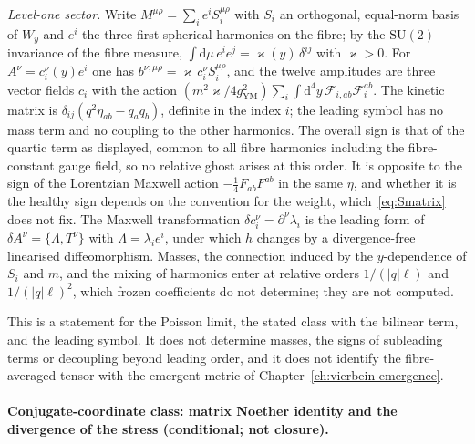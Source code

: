 \emph{Level-one sector.} Write \(M^{\mu\rho}=\sum_ie^iS_i^{\mu\rho}\) with \(S_i\) an orthogonal, equal-norm basis of \(W_y\) and \(e^i\) the three first spherical harmonics on the fibre; by the \(\mathrm{SU}(2)\) invariance of the fibre measure, \(\int\mathrm d\mu\,e^ie^j=\varkappa(y)\,\delta^{ij}\) with \(\varkappa>0\). For \(A^\nu=c^\nu_i(y)e^i\) one has \(b^{\nu;\mu\rho}=\varkappa\,c^\nu_iS_i^{\mu\rho}\), and the twelve amplitudes are three vector fields \(c_i\) with the action \((m^2\varkappa/4g_{\mathrm{YM}}^2)\sum_i\int\mathrm d^4y\,\mathcal F_{i,ab}\mathcal F_i^{ab}\). The kinetic matrix is \(\delta_{ij}(q^2\eta_{ab}-q_aq_b)\), definite in the index \(i\); the leading symbol has no mass term and no coupling to the other harmonics. The overall sign is that of the quartic term as displayed, common to all fibre harmonics including the fibre-constant gauge field, so no relative ghost arises at this order. It is opposite to the sign of the Lorentzian Maxwell action \(-\tfrac14F_{ab}F^{ab}\) in the same \(\eta\), and whether it is the healthy sign depends on the convention for the weight, which~\eqref{eq:Smatrix} does not fix. The Maxwell transformation \(\delta c_i^\nu=\partial^\nu\lambda_i\) is the leading form of \(\delta A^\nu=\{\Lambda,T^\nu\}\) with \(\Lambda=\lambda_ie^i\), under which \(h\) changes by a divergence-free linearised diffeomorphism. Masses, the connection induced by the \(y\)-dependence of \(S_i\) and \(m\), and the mixing of harmonics enter at relative orders \(1/(|q|\ell)\) and \(1/(|q|\ell)^2\), which frozen coefficients do not determine; they are not computed.



This is a statement for the Poisson limit, the stated class with the bilinear term, and the leading symbol. It does not determine masses, the signs of subleading terms or decoupling beyond leading order, and it does not identify the fibre-averaged tensor with the emergent metric of Chapter~\ref{ch:vierbein-emergence}.





\paragraph{Conjugate-coordinate class: matrix Noether identity and the divergence of the stress (conditional; not closure).} \label{detail:sec-F-paragraphconjugatecoordinatecl-32}

